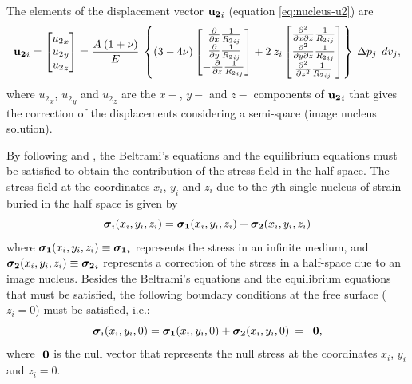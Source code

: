 \documentclass[journal abbreviation, manuscript]{copernicus}
\begin{document}
The elements  of the displacement vector ${\bf{u_{2}}}_{i} $ (equation \ref{eq:nucleus-u2}) are
\begin{equation}
{\bf{u_{2}}}_{i}  = 
\begin{bmatrix} 
{u_{2}}_x \\
{u_{2}}_y \\
{u_{2}}_z
\end{bmatrix}
 = \frac{A  \: (1 + \nu)}{E} \: \left\{   (3  - 4 \nu)
\begin{bmatrix} 
  \: \frac{\partial }{\partial x} {\frac{1}{{R_2}_{ij}}}  \\
  \: \frac{\partial }{\partial y} {\frac{1}{{R_2}_{ij}}}  \\
 - \frac{\partial }{\partial z} {\frac{1}{{R_2}_{ij}}}  
\end{bmatrix}
+ 2 \: z_{i}
\begin{bmatrix} 
\frac{\partial^{2}  }{\partial x \partial z} {\frac{1}{{R_2}_{ij}}} \\
\frac{\partial^{2} }{\partial y \partial z} {\frac{1}{{R_2}_{ij}}} \\
\frac{\partial^{2} }{\partial z^{2}} {\frac{1}{{R_2}_{ij}}} 
\end{bmatrix}
\right\}
\: \Delta p_{j} \: \:dv_j,
\label{eq:nucleus-u2-vector}
\end{equation}
where ${u_{2}}_x$, ${u_{2}}_y$ and ${u_{2}}_z$ are the $x-$, $y-$  and $z-$ components
of  ${\bf{u_{2}}}_{i} $ that gives the correction of the displacements considering  a semi-space (image nucleus solution).

By following \cite{Sharma56} and \cite{Tempone10}, the Beltrami’s equations \citep{Beltrami} and the equilibrium equations must be satisfied to obtain the contribution of the stress field in the half space. 
The stress field  at the coordinates $x_i$, $y_i$ and $z_i$  due to the $j$th single nucleus of strain buried in the half space is given by
\begin{equation}
\mbox{\boldmath$\sigma$}_{i}(x_i,y_i,z_i) = \mbox{\boldmath$\sigma_{1}$}(x_i,y_i,z_i) + 
\mbox{\boldmath$\sigma_{2}$}(x_i,y_i,z_i) 
\label{eq:stress_nucleus}
\end{equation}
where $\mbox{\boldmath$\sigma_{1}$}(x_i,y_i,z_i) \equiv \mbox{\boldmath$\sigma_{1}$}_{i}$ represents the stress in an infinite medium, and 
$\mbox{\boldmath$\sigma_{2}$}(x_i,y_i,z_i) \equiv \mbox{\boldmath$\sigma_{2}$}_{i}$ represents a correction of the stress in a half-space due to an image nucleus.
Besides the Beltrami’s equations \citep{Beltrami} and the equilibrium equations that must be satisfied, the following boundary conditions at the free surface ($z_i = 0$) must be satisfied, i.e.:
\begin{equation}
\mbox{\boldmath$\sigma$}_{i}(x_i,y_i,0) = \mbox{\boldmath$\sigma_{1}$}(x_i,y_i,0) + 
\mbox{\boldmath$\sigma_{2}$}(x_i,y_i,0) \: = \: \mbox{ \boldmath$0$},
\label{eq:null_stress}
\end{equation}
where $\mbox{ \boldmath$0$}$ is the null vector that represents the null stress at the coordinates $x_i$, $y_i$ and $z_i = 0$.
\end{document}
